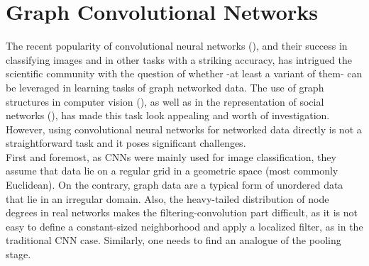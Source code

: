 \section{Graph Convolutional Networks}

The recent popularity of convolutional neural networks (\cite{40k}), and their
success in classifying images and in other tasks with a striking accuracy, has intrigued the scientific
community with the question of whether -at least a variant of them- can be leveraged in learning tasks
of graph networked data. The use of graph structures in computer
vision (\cite{survey}), as well as in the representation of social networks
(\cite{kleinberg_book}), has made this task look appealing and worth of investigation.
However, using convolutional neural networks for
networked data directly is not a straightforward task and it poses significant
challenges.\\

 First and foremost,
as CNNs were mainly used for image classification, they assume that
data lie on a regular grid in a geometric space (most commonly
Euclidean). On the contrary, graph data are a typical form of unordered data that lie in
an irregular domain. Also, the heavy-tailed distribution of node degrees
in real networks \cite{smth} makes the filtering-convolution part difficult,
as it is not easy to define a constant-sized neighborhood and apply a
localized filter, as in the traditional CNN case. Similarly, one needs to find an analogue of the pooling stage.\\

